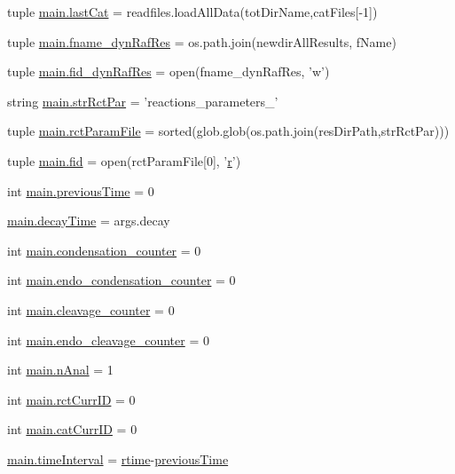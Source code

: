 \begin{DoxyCompactItemize}
\item 
tuple \hyperlink{a00117_ad65fb0887c659a9bf884cba677b67272}{main.\-last\-Cat} = readfiles.\-load\-All\-Data(tot\-Dir\-Name,cat\-Files\mbox{[}-\/1\mbox{]})
\item 
tuple \hyperlink{a00117_a6a031fb0c5a0a5519fc4c3f6d7ef35d1}{main.\-fname\-\_\-dyn\-Raf\-Res} = os.\-path.\-join(newdir\-All\-Results, f\-Name)
\item 
tuple \hyperlink{a00117_aaff6b4fb4c2e2089c2a207a12f1757e3}{main.\-fid\-\_\-dyn\-Raf\-Res} = open(fname\-\_\-dyn\-Raf\-Res, 'w')
\item 
string \hyperlink{a00117_af48af84bff2351a55727aba6a63c1b52}{main.\-str\-Rct\-Par} = 'reactions\-\_\-parameters\-\_\-'
\item 
tuple \hyperlink{a00117_ac4e9cba2fd0b813ba19029541ad609e5}{main.\-rct\-Param\-File} = sorted(glob.\-glob(os.\-path.\-join(res\-Dir\-Path,str\-Rct\-Par)))
\item 
tuple \hyperlink{a00117_a68ab0ffa4b5ff1cceff01f4abe686ad0}{main.\-fid} = open(rct\-Param\-File\mbox{[}0\mbox{]}, '\hyperlink{a00031_ac862e7284527eb913b1351c8bfb8e079}{r}')
\item 
int \hyperlink{a00117_a6a6de947e3b6ada5ea6e761d208228bd}{main.\-previous\-Time} = 0
\item 
\hyperlink{a00117_a5517c07ae046c271d6291e9b3f7d139d}{main.\-decay\-Time} = args.\-decay
\item 
int \hyperlink{a00117_a358b60986e7e25df0dfb61562b7aa3e2}{main.\-condensation\-\_\-counter} = 0
\item 
int \hyperlink{a00117_a0521d81d319c4d79433b5fb65a6da1c2}{main.\-endo\-\_\-condensation\-\_\-counter} = 0
\item 
int \hyperlink{a00117_aba28788973ae3e9140b53078efe5d204}{main.\-cleavage\-\_\-counter} = 0
\item 
int \hyperlink{a00117_a17b22b48a2afe0223186b4275fe5ba70}{main.\-endo\-\_\-cleavage\-\_\-counter} = 0
\item 
int \hyperlink{a00117_ae7ca1c378927da05feb71e5a9f775afb}{main.\-n\-Anal} = 1
\item 
int \hyperlink{a00117_a53e397dea15f17442a198395e65b377b}{main.\-rct\-Curr\-I\-D} = 0
\item 
int \hyperlink{a00117_aa56c55225fa65fa569bd8d5f1063550e}{main.\-cat\-Curr\-I\-D} = 0
\item 
\hyperlink{a00117_a5ba0cd0b7538ed8047b2fea322ecb4b7}{main.\-time\-Interval} = \hyperlink{a00028_afc6b38657a313b9f1de2ee356910b6ee}{rtime}-\/\hyperlink{a00028_a17b8652a085b5add031a40fb1c9a680e}{previous\-Time}

\end{DoxyCompactItemize}

